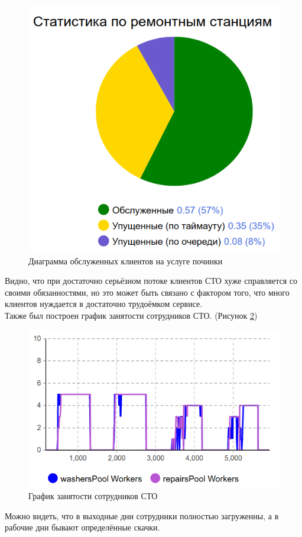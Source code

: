\documentclass[14pt,fleqn]{extarticle}
\begin{document}
	\begin{figure}[h]
		\centering \includegraphics[scale=0.35]{carwashing_anylogic_repairing}
		\caption{Диаграмма обслуженных клиентов на услуге починки}
		\label{fig:carwashing_anylogic_repairing}
	\end{figure}
	
	Видно, что при достаточно серьёзном потоке клиентов СТО хуже справляется со своими обязанностями, но это может быть связано с фактором того, что много клиентов нуждается в достаточно трудоёмком сервисе.\\
	
	Также был построен график занятости сотрудников СТО. (Рисунок \ref{fig:carwashing_anylogic_workers})
	
	\begin{figure}[h]
		\centering \includegraphics[scale=0.5]{carwashing_anylogic_workers}
		\caption{График занятости сотрудников СТО}
		\label{fig:carwashing_anylogic_workers}
	\end{figure}

	Можно видеть, что в выходные дни сотрудники полностью загруженны, а в рабочие дни бывают определённые скачки.
\end{document}
